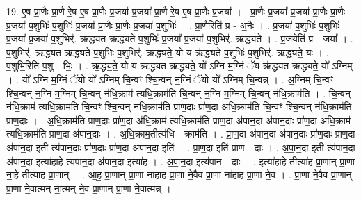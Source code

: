 \documentclass[17pt]{extarticle}
\begin{document}
19. ए॒ष प्रा॒णैः प्रा॒णै रे॒ष ए॒ष प्रा॒णैः प्र॒जया᳚ प्र॒जया᳚ प्रा॒णै रे॒ष ए॒ष प्रा॒णैः प्र॒जया᳚ । . प्रा॒णैः प्र॒जया᳚ प्र॒जया᳚ प्रा॒णैः प्रा॒णैः प्र॒जया॑ प॒शुभिः॑ प॒शुभिः॑ प्र॒जया᳚ प्रा॒णैः प्रा॒णैः प्र॒जया॑ प॒शुभिः॑ । . प्रा॒णैरिति॑ प्र - अ॒नैः । . प्र॒जया॑ प॒शुभिः॑ प॒शुभिः॑ प्र॒जया᳚ प्र॒जया॑ प॒शुभिर्॑. ऋद्ध्यत ऋद्ध्यते प॒शुभिः॑ प्र॒जया᳚ प्र॒जया॑ प॒शुभिर्॑. ऋद्ध्यते । . प्र॒जयेति॑ प्र - जया᳚ । . प॒शुभिर्॑. ऋद्ध्यत ऋद्ध्यते प॒शुभिः॑ प॒शुभिर्॑. ऋद्ध्यते॒ यो य ऋ॑द्ध्यते प॒शुभिः॑ प॒शुभिर्॑. ऋद्ध्यते॒ यः । . प॒शुभि॒रिति॑ प॒शु - भिः॒ । . ऋ॒द्ध्य॒ते॒ यो य ऋ॑द्ध्यत ऋद्ध्यते॒ यो᳚ ऽग्नि म॒ग्निं ॅय ऋ॑द्ध्यत ऋद्ध्यते॒ यो᳚ ऽग्निम् । . यो᳚ ऽग्नि म॒ग्निं ॅयो यो᳚ ऽग्निम् चि॒न्वꣳ श्चि॒न्वन् न॒ग्निं ॅयो यो᳚ ऽग्निम् चि॒न्वन्न् । . अ॒ग्निम् चि॒न्वꣳ श्चि॒न्वन् न॒ग्नि म॒ग्निम् चि॒न्वन् न॑धि॒क्राम॑ त्यधि॒क्राम॑ति चि॒न्वन् न॒ग्नि म॒ग्निम् चि॒न्वन् न॑धि॒क्राम॑ति । . चि॒न्वन् न॑धि॒क्राम॑ त्यधि॒क्राम॑ति चि॒न्वꣳ श्चि॒न्वन् न॑धि॒क्राम॑ति प्राण॒दाः प्रा॑ण॒दा अ॑धि॒क्राम॑ति चि॒न्वꣳ श्चि॒न्वन् न॑धि॒क्राम॑ति प्राण॒दाः । . अ॒धि॒क्राम॑ति प्राण॒दाः प्रा॑ण॒दा अ॑धि॒क्राम॑ त्यधि॒क्राम॑ति प्राण॒दा अ॑पान॒दा अ॑पान॒दाः प्रा॑ण॒दा अ॑धि॒क्राम॑ त्यधि॒क्राम॑ति प्राण॒दा अ॑पान॒दाः । . अ॒धि॒क्राम॒तीत्य॑धि - क्राम॑ति । . प्रा॒ण॒दा अ॑पान॒दा अ॑पान॒दाः प्रा॑ण॒दाः प्रा॑ण॒दा अ॑पान॒दा इती त्य॑पान॒दाः प्रा॑ण॒दाः प्रा॑ण॒दा अ॑पान॒दा इति॑ । . प्रा॒ण॒दा इति॑ प्राण - दाः । . अ॒पा॒न॒दा इती त्य॑पान॒दा अ॑पान॒दा इत्या॑हा॒हे त्य॑पान॒दा अ॑पान॒दा इत्या॑ह । . अ॒पा॒न॒दा इत्य॑पान - दाः । . इत्या॑हा॒हे तीत्या॑ह प्रा॒णान् प्रा॒णा ना॒हे तीत्या॑ह प्रा॒णान् । . आ॒ह॒ प्रा॒णान् प्रा॒णा ना॑हाह प्रा॒णा ने॒वैव प्रा॒णा ना॑हाह प्रा॒णा ने॒व । . प्रा॒णा ने॒वैव प्रा॒णान् प्रा॒णा ने॒वात्मन् ना॒त्मन् ने॒व प्रा॒णान् प्रा॒णा ने॒वात्मन्न् । \newline
\end{document}
